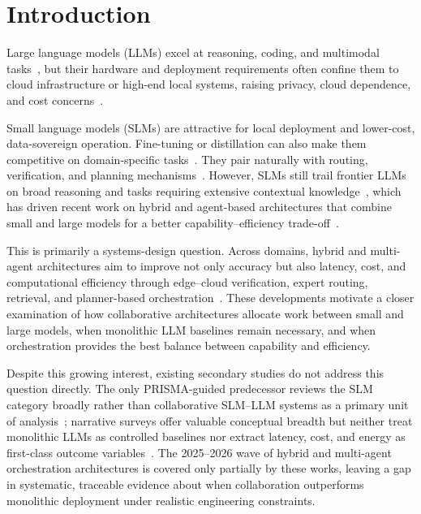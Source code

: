 \section{Introduction}

Large language models (LLMs) excel at reasoning, coding, and multimodal tasks~\cite{olfactory2025,staticanalysis2025,egi2025}, but their hardware and deployment requirements often confine them to cloud infrastructure or high-end local systems, raising privacy, cloud dependence, and cost concerns~\cite{energytoken2025,qwqrouting2025,tigani2025cpu,aydin2025integrated}.

Small language models (SLMs) are attractive for local deployment and lower-cost, data-sovereign operation. Fine-tuning or distillation can also make them competitive on domain-specific tasks~\cite{xie2025fusing,zhu2024distilling,rethinkllm2025}. They pair naturally with routing, verification, and planning mechanisms~\cite{aydin2025integrated,qwqrouting2025,ji2025raprag}. However, SLMs still trail frontier LLMs on broad reasoning and tasks requiring extensive contextual knowledge~\cite{egi2025,dorfner2024comparing}, which has driven recent work on hybrid and agent-based architectures that combine small and large models for a better capability--efficiency trade-off~\cite{hao2024hybrid,shao2025dot,multiagent2025}.

This is primarily a systems-design question. Across domains, hybrid and multi-agent architectures aim to improve not only accuracy but also latency, cost, and computational efficiency through edge--cloud verification, expert routing, retrieval, and planner-based orchestration~\cite{hao2024hybrid,lee2024orchestrallm,alabbasi2024teleoracle,ji2025raprag,chatzistefanidis2025symbiotic,han2025chest,energytoken2025}. These developments motivate a closer examination of how collaborative architectures allocate work between small and large models, when monolithic LLM baselines remain necessary, and when orchestration provides the best balance between capability and efficiency.

Despite this growing interest, existing secondary studies do not address this question directly. The only PRISMA-guided predecessor reviews the SLM category broadly rather than collaborative SLM--LLM systems as a primary unit of analysis~\cite{slmreview2025prisma}; narrative surveys offer valuable conceptual breadth but neither treat monolithic LLMs as controlled baselines nor extract latency, cost, and energy as first-class outcome variables~\cite{wang2024slmsurvey,chen2025collabmech,wang2025collabperf}. The 2025--2026 wave of hybrid and multi-agent orchestration architectures is covered only partially by these works, leaving a gap in systematic, traceable evidence about when collaboration outperforms monolithic deployment under realistic engineering constraints.

